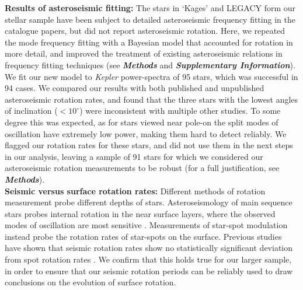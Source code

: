 \documentclass[12pt]{article}
\newcommand{\kepler}{\emph{Kepler}\xspace}
\begin{document}
\textbf{Results of asteroseismic fitting:} The stars in `Kages' and LEGACY form our stellar sample have been subject to detailed asteroseismic frequency fitting in the catalogue papers, but did not report asteroseismic rotation. Here, we repeated the mode frequency fitting with a Bayesian model that accounted for rotation in more detail, and improved the treatment of existing asteroseismic relations in frequency fitting techniques (see \textbf{\textit{Methods}} and \textit{\textbf{Supplementary Information}}). We fit our new model to \kepler power-spectra of 95 stars, which was successful in 94 cases. We compared our results with both published and unpublished asteroseismic rotation rates, and found that the three stars with the lowest angles of inclination ($< 10^\circ$) were inconsistent with multiple other studies. To some degree this was expected, as  for stars viewed near pole-on the split modes of oscillation have extremely low power, making them hard to detect reliably. We flagged our rotation rates for these stars, and did not use them in the next steps in our analysis, leaving a sample of 91 stars for which we considered our asteroseismic rotation measurements to be robust (for a full justification, see \textit{\textbf{Methods}}).\\

\textbf{Seismic versus surface rotation rates:} Different methods of rotation measurement probe different depths of stars. Asteroseismology of main sequence stars probes internal rotation in the near surface layers, where the observed modes of oscillation are most sensitive \cite{lund+2014}. Measurements of star-spot modulation instead probe the rotation rates of star-spots on the surface. Previous studies have shown that seismic rotation rates show no statistically significant deviation from spot rotation rates \cite{nielsen+2015, benomar+2015}. We confirm that this holds true for our larger sample, in order to ensure that our seismic rotation periods can be reliably used to draw conclusions on the evolution of surface rotation.
\end{document}
